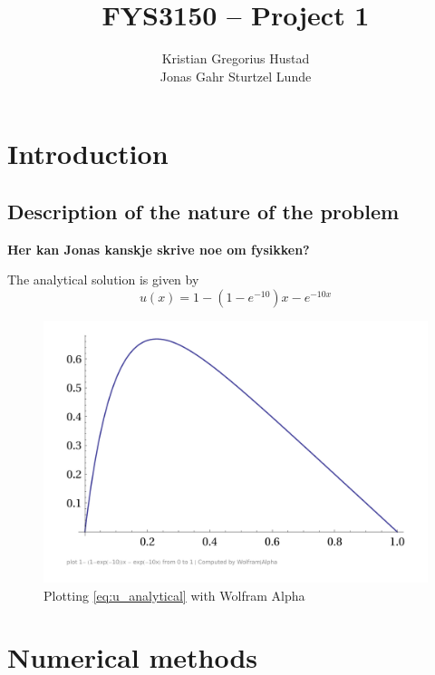 \documentclass[a4paper]{article}
\begin{document}
\title{FYS3150 -- Project 1}
\author{Kristian Gregorius Hustad \\
        Jonas Gahr Sturtzel Lunde}

\maketitle


\newcommand{\half}{\frac{1}{2}}
\newcommand{\dx}{{\Delta x}}


\section{Introduction}
\subsection{Description of the nature of the problem}
\textbf{Her kan Jonas kanskje skrive noe om fysikken?}


The analytical solution is given by
\begin{equation}
    u(x) = 1-(1-e^{-10})x-e^{-10x}
    \label{eq:u_analytical}
\end{equation}

\begin{figure}[ht]
\includegraphics[width=\textwidth]{fig/exact_solution_wolfram_alpha_plot}
\caption{Plotting \eqref{eq:u_analytical} with Wolfram Alpha}
\end{figure}

\section{Numerical methods}
\end{document}

